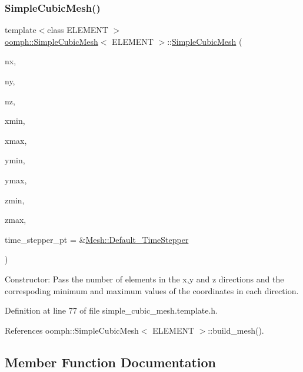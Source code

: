 \subsubsection{\texorpdfstring{Simple\+Cubic\+Mesh()}{SimpleCubicMesh()}\hspace{0.1cm}{\footnotesize\ttfamily [2/2]}}
{\footnotesize\ttfamily template$<$class E\+L\+E\+M\+E\+NT $>$ \\
\hyperlink{classoomph_1_1SimpleCubicMesh}{oomph\+::\+Simple\+Cubic\+Mesh}$<$ E\+L\+E\+M\+E\+NT $>$\+::\hyperlink{classoomph_1_1SimpleCubicMesh}{Simple\+Cubic\+Mesh} (\begin{DoxyParamCaption}\item[{const unsigned \&}]{nx,  }\item[{const unsigned \&}]{ny,  }\item[{const unsigned \&}]{nz,  }\item[{const double \&}]{xmin,  }\item[{const double \&}]{xmax,  }\item[{const double \&}]{ymin,  }\item[{const double \&}]{ymax,  }\item[{const double \&}]{zmin,  }\item[{const double \&}]{zmax,  }\item[{\hyperlink{classoomph_1_1TimeStepper}{Time\+Stepper} $\ast$}]{time\+\_\+stepper\+\_\+pt = {\ttfamily \&\hyperlink{classoomph_1_1Mesh_a12243d0fee2b1fcee729ee5a4777ea10}{Mesh\+::\+Default\+\_\+\+Time\+Stepper}} }\end{DoxyParamCaption})\hspace{0.3cm}{\ttfamily [inline]}}



Constructor\+: Pass the number of elements in the x,y and z directions and the correspoding minimum and maximum values of the coordinates in each direction. 



Definition at line 77 of file simple\+\_\+cubic\+\_\+mesh.\+template.\+h.



References oomph\+::\+Simple\+Cubic\+Mesh$<$ E\+L\+E\+M\+E\+N\+T $>$\+::build\+\_\+mesh().



\subsection{Member Function Documentation}
\mbox{\label{classoomph_1_1SimpleCubicMesh_aea141bf600aaed7c7c9ccfa3f4f1edfc}} 
